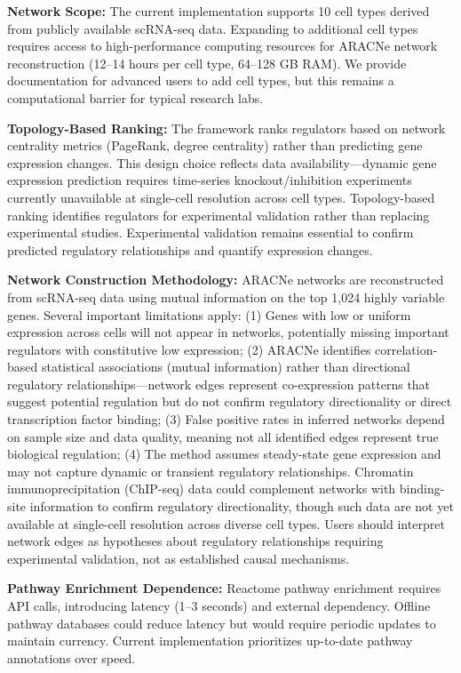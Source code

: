 \documentclass[11pt]{article}
\begin{document}
\textbf{Network Scope:} The current implementation supports 10 cell types derived from publicly available scRNA-seq data. Expanding to additional cell types requires access to high-performance computing resources for ARACNe network reconstruction (12--14 hours per cell type, 64--128 GB RAM). We provide documentation for advanced users to add cell types, but this remains a computational barrier for typical research labs.

\textbf{Topology-Based Ranking:} The framework ranks regulators based on network centrality metrics (PageRank, degree centrality) rather than predicting gene expression changes. This design choice reflects data availability---dynamic gene expression prediction requires time-series knockout/inhibition experiments currently unavailable at single-cell resolution across cell types. Topology-based ranking identifies regulators for experimental validation rather than replacing experimental studies. Experimental validation remains essential to confirm predicted regulatory relationships and quantify expression changes.

\textbf{Network Construction Methodology:} ARACNe networks are reconstructed from scRNA-seq data using mutual information on the top 1,024 highly variable genes. Several important limitations apply: (1) Genes with low or uniform expression across cells will not appear in networks, potentially missing important regulators with constitutive low expression; (2) ARACNe identifies correlation-based statistical associations (mutual information) rather than directional regulatory relationships---network edges represent co-expression patterns that suggest potential regulation but do not confirm regulatory directionality or direct transcription factor binding; (3) False positive rates in inferred networks depend on sample size and data quality, meaning not all identified edges represent true biological regulation; (4) The method assumes steady-state gene expression and may not capture dynamic or transient regulatory relationships. Chromatin immunoprecipitation (ChIP-seq) data could complement networks with binding-site information to confirm regulatory directionality, though such data are not yet available at single-cell resolution across diverse cell types. Users should interpret network edges as hypotheses about regulatory relationships requiring experimental validation, not as established causal mechanisms.

\textbf{Pathway Enrichment Dependence:} Reactome pathway enrichment requires API calls, introducing latency (1--3 seconds) and external dependency. Offline pathway databases could reduce latency but would require periodic updates to maintain currency. Current implementation prioritizes up-to-date pathway annotations over speed.
\end{document}
